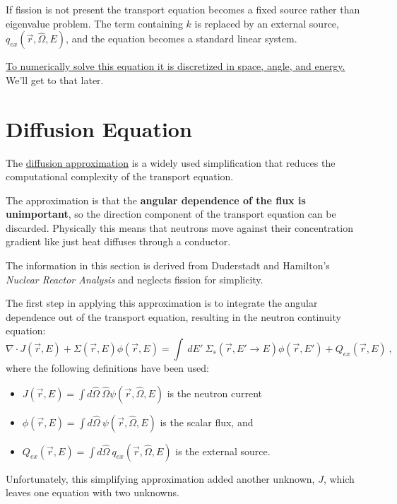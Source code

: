 \documentclass[12pt]{article}
\newcommand{\Macro}{\ensuremath{\Sigma}}
\newcommand{\vOmega}{\ensuremath{\hat{\Omega}}}
\begin{document}
If fission is not present the transport equation becomes a fixed source rather than eigenvalue problem. The term containing $k$ is replaced by an external source, $q_{ex}(\vec{r}, \hat{\Omega}, E)$, and the equation becomes a standard linear system. 

\underline{To numerically solve this equation it is discretized in space, angle, and energy.} We'll get to that later.

\section{Diffusion Equation}

The \underline{diffusion approximation} is a widely used simplification that reduces the computational complexity of the transport equation. 

The approximation is that the \textbf{angular dependence of the flux is unimportant}, so the direction component of the transport equation can be discarded. Physically this means that neutrons move against their concentration gradient like just heat diffuses through a conductor. 

The information in this section is derived from Duderstadt and Hamilton's \emph{Nuclear Reactor Analysis} and neglects fission for simplicity. 

The first step in applying this approximation is to integrate the angular dependence out of the transport equation, resulting in the neutron continuity equation:
%
\begin{equation}
  \nabla \cdot J(\vec{r},E) + \Macro(\vec{r},E)\phi(\vec{r},E) = \int \:dE' \:\Macro_{s}(\vec{r}, E' \to E)\phi(\vec{r},E') + Q_{ex}(\vec{r},E) \:,
  \label{eq:continuity} 
\end{equation}
%
where the following definitions have been used:
%
\begin{itemize}
\item $J(\vec{r},E) = \int d\vOmega \:\vOmega \psi(\vec{r}, \vOmega, E)$ is the neutron current \\
\item  $\phi(\vec{r},E) = \int d\vOmega \:\psi(\vec{r}, \vOmega, E)$ is the scalar flux, and \\
\item $Q_{ex} (\vec{r},E)= \int d\vOmega \:q_{ex}(\vec{r}, \vOmega, E)$ is the external source.
\end{itemize}

Unfortunately, this simplifying approximation added another unknown, $J$, which leaves one equation with two unknowns. 
\end{document}
